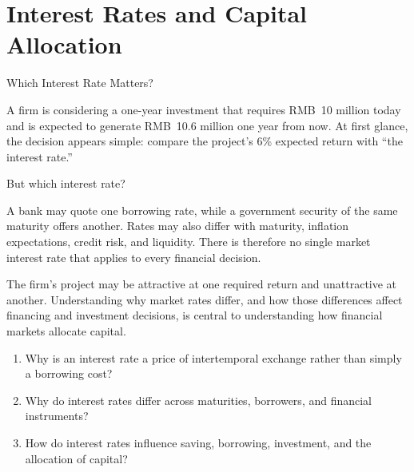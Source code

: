 \chapter{Interest Rates and Capital Allocation}
\label{chap:Interest_Rates_and_Capital_Allocation}

\begin{openingcase}{Which Interest Rate Matters?}

A firm is considering a one-year investment that requires RMB~10 million today and is expected to generate RMB~10.6 million one year from now. At first glance, the decision appears simple: compare the project's 6\% expected return with ``the interest rate.''

But which interest rate?

A bank may quote one borrowing rate, while a government security of the same maturity offers another. Rates may also differ with maturity, inflation expectations, credit risk, and liquidity. There is therefore no single market interest rate that applies to every financial decision.

The firm's project may be attractive at one required return and unattractive at another. Understanding why market rates differ, and how those differences affect financing and investment decisions, is central to understanding how financial markets allocate capital.

\end{openingcase}

\begin{tcolorbox}[
  enhanced,
  colback=FinanceBlue!6,
  colframe=FinanceBlue,
  boxrule=0.6pt,
  sharp corners,
  left=8pt,
  right=8pt,
  top=7pt,
  bottom=7pt,
  before skip=1em,
  after skip=1.6em,
  title=\textbf{Core Questions},
  coltitle=white,
  colbacktitle=FinanceBlue,
  fonttitle=\bfseries,
  attach boxed title to top left={xshift=6pt,yshift=-2mm},
  boxed title style={
    boxrule=0pt,
    sharp corners,
    left=5pt,
    right=5pt,
    top=2pt,
    bottom=2pt
  }
]
\begin{enumerate}[
  leftmargin=*,
  label=\textcolor{FinanceBlue}{\textbf{\arabic*.}},
  itemsep=0.55em,
  topsep=0.2em
]

\item Why is an interest rate a price of intertemporal exchange rather than simply a borrowing cost?

\item Why do interest rates differ across maturities, borrowers, and financial instruments?

\item How do interest rates influence saving, borrowing, investment, and the allocation of capital?

\end{enumerate}
\end{tcolorbox}

